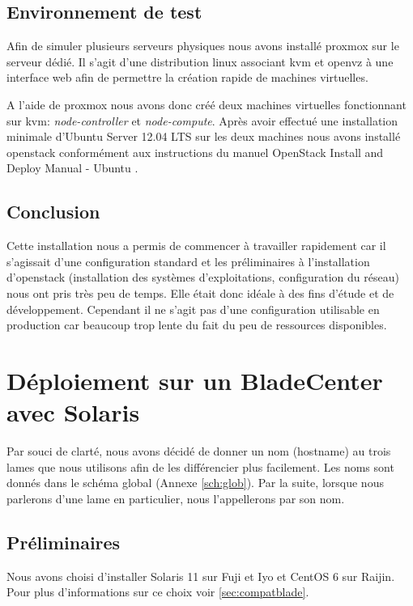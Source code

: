 \documentclass[a4paper,oneside]{report}
\begin{document}
\subsection{Environnement de test}
Afin de simuler plusieurs serveurs physiques nous avons installé \gls{proxmox} sur le serveur dédié. Il s'agit d'une distribution \gls{linux} associant \gls{kvm} et \gls{openvz} à une interface web afin de permettre la création rapide de machines virtuelles.

A l'aide de \gls{proxmox} nous avons donc créé deux machines virtuelles fonctionnant sur \gls{kvm}: \emph{node-controller} et \emph{node-compute}. Après avoir effectué une installation minimale d'Ubuntu Server 12.04 LTS sur les deux machines nous avons installé \gls{openstack} conformément aux instructions du manuel \og OpenStack Install and Deploy Manual - Ubuntu \fg \cite{OSFolsomInstallUbuntu1210}.

\subsection{Conclusion}
Cette installation nous a permis de commencer à travailler rapidement car il s'agissait d'une configuration standard et les préliminaires à l'installation d'\gls{openstack} (installation des systèmes d'exploitations, configuration du réseau) nous ont pris très peu de temps.
Elle était donc idéale à des fins d'étude et de développement.\newline
Cependant il ne s'agit pas d'une configuration utilisable en production car beaucoup trop lente du fait du peu de ressources disponibles.

\section{Déploiement sur un BladeCenter avec Solaris} \label{sec:depsolaris}

Par souci de clarté, nous avons décidé de donner un nom (hostname) au trois lames que nous utilisons afin de les différencier plus facilement.
Les noms sont donnés dans le schéma global (Annexe \ref{sch:glob}).
Par la suite, lorsque nous parlerons d'une lame en particulier, nous l'appellerons par son nom.

\subsection{Préliminaires}
Nous avons choisi d'installer Solaris 11 sur Fuji et Iyo et CentOS 6 sur Raijin.
Pour plus d'informations sur ce choix voir \ref{sec:compatblade}.
\end{document}
